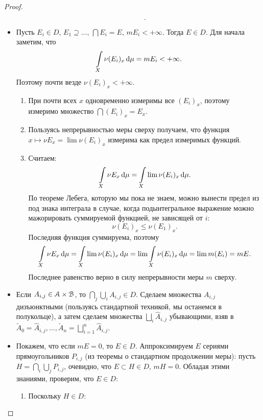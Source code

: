 \begin{proof}
\begin{itemize}
\begin{enumerate}
\[.\]
            \end{enumerate}
        \item Пусть $E_i \in D$, $E_1 \supseteq \ldots $, $\bigcap{E_i} = E$, $m{E_i} < +\infty$.
            Тогда $E \in D$. Для начала заметим, что
\[
    \int\limits_X{\nu{(E_i)_x} \,\mathrm{d}\mu} = m{E_i} < +\infty
.\]
            Поэтому почти везде $\nu{(E_i)_x} < +\infty$.
            \begin{enumerate}
                \item При почти всех $x$ одновременно измеримы все $(E_i)_x$, поэтому измеримо
                    множество $\bigcap{(E_i)_x} = E_x$.
                \item Пользуясь непрерывностью меры сверху получаем, что функция
                    $x \mapsto \nu{E_x} = \lim{\nu{(E_i)_x}}$ измерима как предел измеримых функций.
                \item Считаем:
\[
    \int\limits_X{\nu{E_x} \,\mathrm{d}\mu} = \int\limits_X{\lim{\nu{(E_i)_x}} \,\mathrm{d}\mu}
.\]
                По теореме Лебега, которую мы пока не знаем, можно вынести предел из под знака интеграла
                в случае, когда подынтегральное выражение можно мажорировать суммируемой функцией, 
                не зависящей от $i$:
\[
    \nu{(E_i)_x} \leqslant \nu{(E_1)_x}
.\]
                Последняя функция суммируема, поэтому
\[
    \int\limits_X{\nu{E_x} \,\mathrm{d}\mu} = \int\limits_X{\lim{\nu{(E_i)_x}} \,\mathrm{d}\mu} = \lim{\int\limits_X{\nu{(E_i)_x} \,\mathrm{d}\mu}} =
    \lim{m(E_i)} = m{E}
.\]
                Последнее равенство верно в силу непрерывности меры $m$ сверху.
            \end{enumerate}
        \item Если $A_{i,j} \in \mathcal{A} \times \mathcal{B}$, то $\bigcap_j{\bigcup_i{A_{i,j}}} \in D$.
                Сделаем множества $A_{i, j}$ дизъюнктными (пользуясь стандартной техникой, мы останемся в полукольце),
                а затем сделаем множества $\bigsqcup_i{\hat{A}_{i, j}}$ убывающими, взяв
                в $\widetilde{A}_0 = \hat{A}_{i, j}, \ldots, \widetilde{A}_n = \bigsqcup_{i = 1}^n{\hat{A}_{i, j}}$.
        \item Покажем, что если $m{E} = 0$, то $E \in D$. Аппроксимируем $E$ сериями прямоугольников
                $P_{i, j}$ (из теоремы о стандартном продолжении меры): пусть $H = \bigcap_i{\bigcup_j{P_{i, j}}}$, 
                очевидно, что $E \subset H \in D$, $m{H} = 0$. Обладая этими знаниями, проверим, что $E \in D$:
            \begin{enumerate}
                \item Поскольку $H \in D$:

\end{enumerate}
\end{itemize}
\end{proof}

